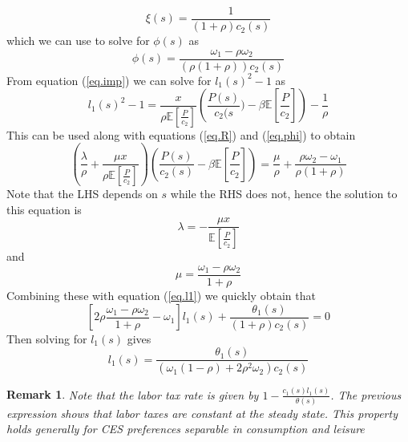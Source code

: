 \documentclass[thmsb,11pt]{article}
\newtheorem{remark}{Remark}
\begin{document}
\begin{equation}
\xi(s) = \frac1{\left(1+\rho\right)c_2(s)}\label{eq.xi}
\end{equation}%
which we can use to solve for $\phi(s)$ as
\begin{equation}
\phi(s) = \frac{\omega_1-\rho\omega_2}{\left(\rho(1+\rho)\right)c_2(s)}
\label{eq.phi}
\end{equation}
From equation (\ref{eq.imp}) we can solve for $l_1(s)^2 -1$ as
\begin{equation*}
l_1(s)^2-1 = \frac{x}{\rho\mathbb{E}[\frac{P}{c_2}]}\left(\frac
{P(s)}{c_2(s})-\beta\mathbb{E}\left[\frac{P}{c_2}\right]\right)-\frac1\rho
\end{equation*}%
This can be used along with equations (\ref{eq.R}) and (\ref{eq.phi}) to
obtain
\begin{equation*}
\left(\frac\lambda \rho+\frac{\mu x}{\rho\mathbb{E}[\frac{P}{c_2}]}%
\right)\left(\frac{P(s)}{c_2(s)}-\beta\mathbb{E}\left[\frac{P}{c_2}\right]%
\right) = \frac{\mu}{\rho}+\frac{\rho\omega_2-\omega_1}{\rho(1+\rho)}
\end{equation*}
Note that the LHS depends on $s$ while the RHS does not, hence the solution to
this equation is
\begin{equation}
\lambda = - \frac{\mu x}{\mathbb{E}[\frac{P}{c_2}]}
\end{equation}%
and
\begin{equation}
\mu = \frac{\omega_1-\rho\omega_2}{1+\rho}  \label{eq.mu}
\end{equation}
Combining these with equation (\ref{eq.l1}) we quickly obtain that
\begin{equation*}
\left[2\rho\frac{\omega_1-\rho\omega_2}{1+\rho}-\omega_1\right]%
l_1(s)+\frac{\theta_1(s)}{\left(1+\rho\right)c_2(s)} = 0
\end{equation*}%
Then solving for $l_1(s)$ gives
\begin{equation*}
l_1(s) = \frac{\theta_1(s)}{\left(\omega_1(1-\rho)+2\rho^2\omega_2\right)c_2(s)}
\end{equation*}

\begin{remark}
Note that the labor tax rate is given by $1-\frac{c_1(s)l_1(s)}{\theta(s)}$. The previous expression shows that labor taxes are constant at the steady state. This property holds generally for CES preferences separable in consumption and leisure
\end{remark}
\end{document}
